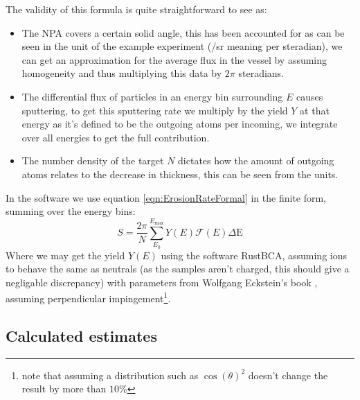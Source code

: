 \documentclass{article}
\begin{document}
The validity of this formula is quite straightforward to see as:
\begin{itemize}
    \item The NPA covers a certain solid angle, this has been accounted for as
        can be seen in the unit of the example experiment (/sr meaning per
        steradian), we can get an approximation for the average
        flux in the vessel by assuming homogeneity and thus multiplying this
data by $2\pi$ steradians. 
    \item The differential flux of particles in an energy bin surrounding $E$ causes sputtering, to get this
        sputtering rate we multiply by the yield $Y$ at that energy as it's defined to be the
        outgoing atoms per incoming, we integrate over all energies to get the
        full contribution. 
    \item The number density of the target $N$ dictates how the amount of
        outgoing atoms relates to the decrease in thickness, this can be seen from the units.
\end{itemize}
In the software we use equation \ref{eqn:ErosionRateFormal} in the finite form,
summing over the energy bins:
\begin{equation}
S = \frac{2\pi}{N}\sum_{E_0}^{E_{\text{max}}} Y(E)\mathcal{F}(E)\Delta\text{E}
    \label{eqn:ErosionRateFinite}
\end{equation}
Where we may get the yield $Y(E)$ using the software RustBCA\cite{RustBCA},
assuming ions to behave the same as neutrals (as the samples aren't charged,
this should give a negligable discrepancy) with parameters from Wolfgang Eckstein's
book \cite{eckstein2013computer}, assuming perpendicular impingement\footnote{note that
assuming a distribution such as $\cos(\theta)^2$ doesn't change the result by more than $10\%$}.
\subsection{Calculated estimates}



\end{document}
